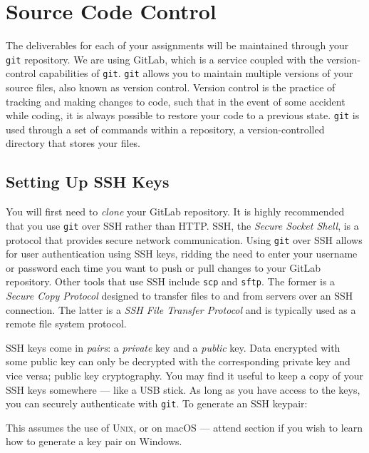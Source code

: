 \section{Source Code Control}

\noindent The deliverables for each of your assignments will be
maintained through your \texttt{git} repository. We are using GitLab,
which is a service coupled with the version-control capabilities of
\texttt{git}. \texttt{git} allows you to maintain multiple versions of
your source files, also known as version control. Version control is the
practice of tracking and making changes to code, such that in the event
of some accident while coding, it is always possible to restore your
code to a previous state. \texttt{git} is used through a set of commands
within a repository, a version-controlled directory that stores your
files.

\subsection{Setting Up SSH Keys}

You will first need to \emph{clone} your GitLab repository. It is highly
recommended that you use \texttt{git} over SSH rather than HTTP\@. SSH,
the \emph{Secure Socket Shell}, is a protocol that provides secure
network communication. Using \texttt{git} over SSH allows for user
authentication using SSH keys, ridding the need to enter your username
or password each time you want to push or pull changes to your GitLab
repository. Other tools that use SSH include \texttt{scp} and
\texttt{sftp}. The former is a \emph{Secure Copy Protocol} designed to
transfer files to and from servers over an SSH connection. The latter is
a \emph{SSH File Transfer Protocol} and is typically used as a remote
file system protocol.

SSH keys come in \emph{pairs}: a \emph{private} key and a \emph{public}
key. Data encrypted with some public key can only be decrypted with the
corresponding private key and vice versa; public key cryptography. You
may find it useful to keep a copy of your SSH keys somewhere --- like a
USB stick. As long as you have access to the keys, you can securely
authenticate with \texttt{git}. To generate an SSH keypair:


This assumes the use of \textsc{Unix}, or on macOS --- attend section if
you wish to learn how to generate a key pair on Windows.

